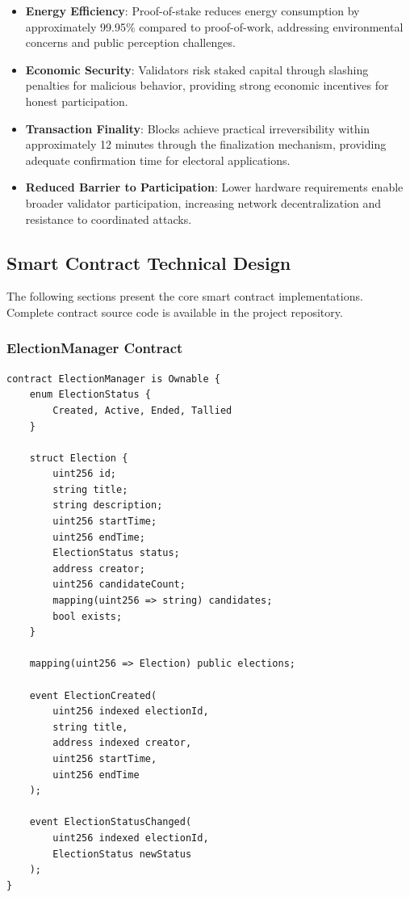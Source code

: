 \documentclass[conference]{IEEEtran}
\begin{document}
\begin{itemize}
    \item \textbf{Energy Efficiency}: Proof-of-stake reduces energy consumption by approximately 99.95\% compared to proof-of-work, addressing environmental concerns and public perception challenges.
    \item \textbf{Economic Security}: Validators risk staked capital through slashing penalties for malicious behavior, providing strong economic incentives for honest participation.
    \item \textbf{Transaction Finality}: Blocks achieve practical irreversibility within approximately 12 minutes through the finalization mechanism, providing adequate confirmation time for electoral applications.
    \item \textbf{Reduced Barrier to Participation}: Lower hardware requirements enable broader validator participation, increasing network decentralization and resistance to coordinated attacks.
\end{itemize}

\subsection{Smart Contract Technical Design}

The following sections present the core smart contract implementations. Complete contract source code is available in the project repository.

\subsubsection{ElectionManager Contract}

\begin{lstlisting}[style=solidity, caption={ElectionManager Core Structure}]
contract ElectionManager is Ownable {
    enum ElectionStatus { 
        Created, Active, Ended, Tallied 
    }
    
    struct Election {
        uint256 id;
        string title;
        string description;
        uint256 startTime;
        uint256 endTime;
        ElectionStatus status;
        address creator;
        uint256 candidateCount;
        mapping(uint256 => string) candidates;
        bool exists;
    }
    
    mapping(uint256 => Election) public elections;
    
    event ElectionCreated(
        uint256 indexed electionId,
        string title,
        address indexed creator,
        uint256 startTime,
        uint256 endTime
    );
    
    event ElectionStatusChanged(
        uint256 indexed electionId,
        ElectionStatus newStatus
    );
}
\end{lstlisting}
\end{document}
